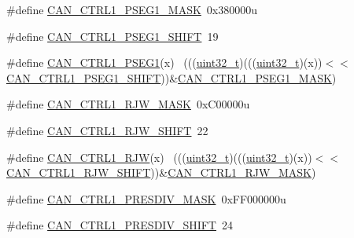 \begin{DoxyCompactItemize}
\#define \hyperlink{group___c_a_n___register___masks_gac32963f42638264064b58687c249c994}{C\+A\+N\+\_\+\+C\+T\+R\+L1\+\_\+\+P\+S\+E\+G1\+\_\+\+M\+A\+SK}~0x380000u
\item 
\#define \hyperlink{group___c_a_n___register___masks_gab92532aaca53b7fae9c2d9d7186e3a91}{C\+A\+N\+\_\+\+C\+T\+R\+L1\+\_\+\+P\+S\+E\+G1\+\_\+\+S\+H\+I\+FT}~19
\item 
\#define \hyperlink{group___c_a_n___register___masks_ga1982e1c68b1837d71d6c39be8e5f21b4}{C\+A\+N\+\_\+\+C\+T\+R\+L1\+\_\+\+P\+S\+E\+G1}(x)                                          ~(((\hyperlink{_p_e___types_8h_a33594304e786b158f3fb30289278f5af}{uint32\+\_\+t})(((\hyperlink{_p_e___types_8h_a33594304e786b158f3fb30289278f5af}{uint32\+\_\+t})(x))$<$$<$\hyperlink{group___c_a_n___register___masks_gab92532aaca53b7fae9c2d9d7186e3a91}{C\+A\+N\+\_\+\+C\+T\+R\+L1\+\_\+\+P\+S\+E\+G1\+\_\+\+S\+H\+I\+FT}))\&\hyperlink{group___c_a_n___register___masks_gac32963f42638264064b58687c249c994}{C\+A\+N\+\_\+\+C\+T\+R\+L1\+\_\+\+P\+S\+E\+G1\+\_\+\+M\+A\+SK})
\item 
\#define \hyperlink{group___c_a_n___register___masks_ga10512d44b72e4fcf8fff8052dba9fd3a}{C\+A\+N\+\_\+\+C\+T\+R\+L1\+\_\+\+R\+J\+W\+\_\+\+M\+A\+SK}~0x\+C00000u
\item 
\#define \hyperlink{group___c_a_n___register___masks_ga6fbcc0f866380f763269138136a2a92e}{C\+A\+N\+\_\+\+C\+T\+R\+L1\+\_\+\+R\+J\+W\+\_\+\+S\+H\+I\+FT}~22
\item 
\#define \hyperlink{group___c_a_n___register___masks_ga3bb08577b4b9ee2cfba3a2f21f840942}{C\+A\+N\+\_\+\+C\+T\+R\+L1\+\_\+\+R\+JW}(x)                                              ~(((\hyperlink{_p_e___types_8h_a33594304e786b158f3fb30289278f5af}{uint32\+\_\+t})(((\hyperlink{_p_e___types_8h_a33594304e786b158f3fb30289278f5af}{uint32\+\_\+t})(x))$<$$<$\hyperlink{group___c_a_n___register___masks_ga6fbcc0f866380f763269138136a2a92e}{C\+A\+N\+\_\+\+C\+T\+R\+L1\+\_\+\+R\+J\+W\+\_\+\+S\+H\+I\+FT}))\&\hyperlink{group___c_a_n___register___masks_ga10512d44b72e4fcf8fff8052dba9fd3a}{C\+A\+N\+\_\+\+C\+T\+R\+L1\+\_\+\+R\+J\+W\+\_\+\+M\+A\+SK})
\item 
\#define \hyperlink{group___c_a_n___register___masks_gad8d384c87d48a3fc0b1ae52949823818}{C\+A\+N\+\_\+\+C\+T\+R\+L1\+\_\+\+P\+R\+E\+S\+D\+I\+V\+\_\+\+M\+A\+SK}~0x\+F\+F000000u
\item 
\#define \hyperlink{group___c_a_n___register___masks_ga762ed1bd89d4db4a6f34a12f8ae0afcf}{C\+A\+N\+\_\+\+C\+T\+R\+L1\+\_\+\+P\+R\+E\+S\+D\+I\+V\+\_\+\+S\+H\+I\+FT}~24
\item 

\end{DoxyCompactItemize}
